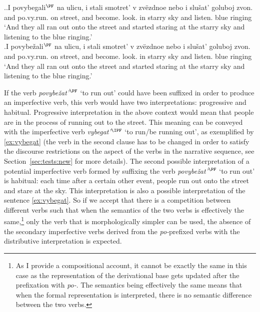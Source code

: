 \ex.\label{ex:povy}\ag.\label{ex:povybegat}I povybegali$^{\PF}$ na ulicu, i stali smotret' v zv\"{e}zdnoe nebo i slu\v{s}at' goluboj zvon.\\
and po.vy.run. on street, and become. look. in starry sky and listen. blue ringing\\
\trans `And they all ran out onto the street and started staring at the starry sky and listening to the blue ringing.'\\
\bg.\label{ex:povybezhat}I povybe\v{z}ali$^{\PF}$ na ulicu, i stali smotret' v zv\"{e}zdnoe nebo i slu\v{s}at' goluboj zvon.\\
and po.vy.run. on street, and become. look. in starry sky and listen. blue ringing\\
\trans `And they all ran out onto the street and started staring at the starry sky and listening to the blue ringing.'

If the verb \textit{povybe\v{z}at'}$^{\PF}$ `to run out' could have been suffixed in order to produce an imperfective verb, this verb would have two interpretations: progressive and habitual. Progressive interpretation in the above context would mean that people are in the process of running out to the street. This meaning can be conveyed with the imperfective verb \textit{vybegat'}$^{\IPF}$ `to run/be running out', as exemplified by \ref{ex:vybegat} (the verb in the second clause has to be changed in order to satisfy the discourse restrictions on the aspect of the verbs in the narrative sequence, see Section~\ref{sec:tests:new} for more details). The second possible interpretation of a potential imperfective verb formed by suffixing the verb \textit{povybe\v{z}at'}$^{\PF}$ `to run out' is habitual: each time after a certain other event, people run out onto the street and stare at the sky. This interpretation is also a possible interpretation of the sentence \ref{ex:vybegat}. So if we accept that there is a competition between different verbs such that when the semantics of the two verbs is effectively the same,\footnote{As I provide a compositional account, it cannot be exactly the same in this case as the representation of the derivational base gets updated after the prefixation with \textit{po-}. The semantics being effectively the same means that when the formal representation is interpreted, there is no semantic difference between the two verbs.} only the verb that is morphologically simpler can be used, the absence of the secondary imperfective verbs derived from the \textit{po-}prefixed verbs with the distributive interpretation is expected.


